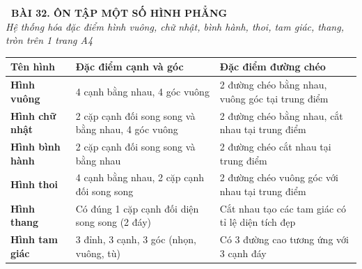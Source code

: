 \documentclass[14pt,a4paper,oneside]{extbook}
\begin{document}
\noindent
\begin{tcolorbox}[
  enhanced,
  colback=teal!8!white,
  colframe=teal!80!black,
  arc=3mm,
  boxrule=1.1pt,
  width=\linewidth,
  halign=center,
  top=2.2mm, bottom=2.2mm,
  left=3mm, right=3mm,
  drop fuzzy shadow
]
  {\large\bfseries\color{teal!95!black}\faBookmark\ BÀI 32. ÔN TẬP MỘT SỐ HÌNH PHẲNG}\\[2pt]
  {\scriptsize\color{black!75}\itshape Hệ thống hóa đặc điểm hình vuông, chữ nhật, bình hành, thoi, tam giác, thang, tròn trên 1 trang A4}
\end{tcolorbox}

\vspace{3.2mm}
\noindent
\begin{tcolorbox}[
  enhanced,
  title={\footnotesize\bfseries\color{white}\faShapes\ 1. Bảng đặc điểm nhận diện các hình phẳng đã học},
  colback=blue!2!white,
  colframe=blue!75!black,
  arc=2.5mm, boxrule=0.8pt, top=1.8mm, bottom=1.8mm, left=2mm, right=2mm
]
  \scriptsize
  \centering
  \begin{tabular}{|l|l|l|}
    \hline
    \textbf{Tên hình} & \textbf{Đặc điểm cạnh và góc} & \textbf{Đặc điểm đường chéo} \\ \hline
    \textbf{Hình vuông} & 4 cạnh bằng nhau, 4 góc vuông & 2 đường chéo bằng nhau, vuông góc tại trung điểm \\ \hline
    \textbf{Hình chữ nhật} & 2 cặp cạnh đối song song và bằng nhau, 4 góc vuông & 2 đường chéo bằng nhau, cắt nhau tại trung điểm \\ \hline
    \textbf{Hình bình hành} & 2 cặp cạnh đối song song và bằng nhau & 2 đường chéo cắt nhau tại trung điểm \\ \hline
    \textbf{Hình thoi} & 4 cạnh bằng nhau, 2 cặp cạnh đối song song & 2 đường chéo vuông góc với nhau tại trung điểm \\ \hline
    \textbf{Hình thang} & Có đúng 1 cặp cạnh đối diện song song (2 đáy) & Cắt nhau tạo các tam giác có tỉ lệ diện tích đẹp \\ \hline
    \textbf{Hình tam giác} & 3 đỉnh, 3 cạnh, 3 góc (nhọn, vuông, tù) & Có 3 đường cao tương ứng với 3 cạnh đáy \\ \hline
  \end{tabular}
\end{tcolorbox}

\vspace{3mm}
\end{document}
